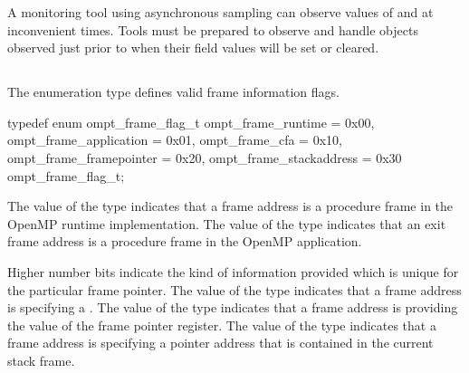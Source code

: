 \begin{note}
A monitoring tool using asynchronous sampling can observe values
of  and  at inconvenient times.
Tools must be prepared to observe and handle 
objects observed just prior to when their field values will be set or
cleared.
\end{note}



\subsection{}
\label{subsubsec:ompt_frame_flag_t}

\summary
The  enumeration type defines valid frame 
information flags.

\syntax
\begin{ccppspecific}
\begin{ompSyntax}
typedef enum ompt_frame_flag_t {
  ompt_frame_runtime        = 0x00,
  ompt_frame_application    = 0x01,
  ompt_frame_cfa            = 0x10,
  ompt_frame_framepointer   = 0x20,
  ompt_frame_stackaddress   = 0x30
} ompt_frame_flag_t; 
\end{ompSyntax}
\end{ccppspecific}

\descr
The value  of the  type
indicates that a frame address is a procedure frame in the OpenMP runtime 
implementation. The value  of the 
 type indicates that an exit frame address is a 
procedure frame in the OpenMP application.

Higher number bits indicate the kind of information provided which is unique
for the particular frame pointer. The value  of the 
 type indicates that a frame address is specifying 
a . The value  
of the  type indicates that a frame address is 
providing the value of the frame pointer register. The value 
 of the  type
indicates that a frame address is specifying a pointer address that is
contained in the current stack frame.
